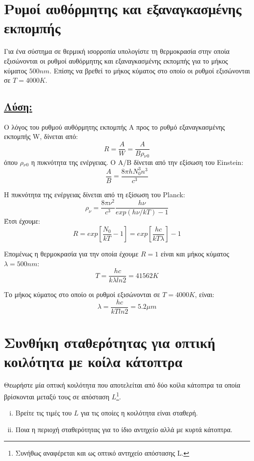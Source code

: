 \documentclass[a4paper,11pt,titlepage]{article}
\numberwithin{equation}{section} %
\begin{document}
\newpage

\section{Ρυμοί αυθόρμητης και εξαναγκασμένης εκπομπής}
Για ένα σύστημα σε θερμική ισορροπία υπολογίστε τη θερμοκρασία στην οποία εξισώνονται οι ρυθμοί αυθόρμητης και εξαναγκασμένης εκπομπής για το μήκος κύματος $500nm$. Επίσης να βρεθεί το μήκος κύματος στο οποίο οι ρυθμοί εξισώνονται σε $T=4000K$.

\subsection*{\underline{Λύση:}}

Ο λόγος του ρυθμού αυθόρμητης εκπομπής Α προς το ρυθμό εξαναγκασμένης εκπομπής W, δίνεται από:
\begin{equation}
 R=\dfrac{A}{W}=\dfrac{A}{B\rho{_\nu{_0}}}
\end{equation}
όπου $\rho{_\nu{_0}}$ η πυκνότητα της ενέργειας. Ο A/B δίνεται από την εξίσωση του Einstein:
\begin{equation}
 \frac{A}{B}=\frac{8{\pi}hN_0^3n^3}{c^3}
\end{equation}

H πυκνότητα της ενέργειας δίνεται από τη εξίσωση του Planck:
\begin{equation}
 \rho_\nu=\frac{8\pi\nu^2}{c^3}\frac{h\nu}{exp(h\nu/kT)-1}
\end{equation}
Έτσι έχουμε:
\begin{equation}
 R=exp[\frac{N_0}{kT}-1]=exp[\frac{hc}{kT\lambda}]-1
\end{equation}

Επομένως η θερμοκρασία για την οποία έχουμε $R=1$ είναι και μήκος κύματος $\lambda=500nm$:
\begin{equation}
 T=\dfrac{hc}{k{\lambda}ln2}=41562K
\end{equation}

Το μήκος κύματος στο οποίο οι ρυθμοί εξισώνονται σε $T=4000K$, είναι:
\begin{equation}
 \lambda=\frac{hc}{kTln2}=5.2{\mu}m
\end{equation}
\newpage
\section{Συνθήκη σταθερότητας για οπτική κοιλότητα με κοίλα κάτοπτρα}

Θεωρήστε μία οπτική κοιλότητα που αποτελείται από δύο κοίλα κάτοπτρα τα οποία βρίσκονται μεταξύ τους σε απόσταση $L$\footnote{Συνήθως αναφέρεται και ως οπτικό αντηχείο απόστασης  L.}.
\begin{enumerate}[(i)]
 \item Βρείτε τις τιμές του $L$ για τις οποίες η κοιλότητα είναι σταθερή.
 \item Ποια η περιοχή σταθερότητας για το ίδιο αντηχείο αλλά με κυρτά κάτοπτρα.
\end{enumerate}
\end{document}

